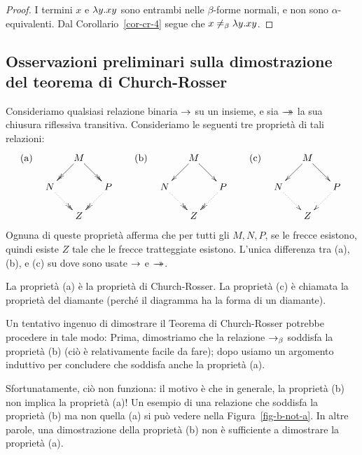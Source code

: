 \documentclass{article}
\begin{document}
\begin{proof}
  I termini $x$ e $\lambda y.xy$ sono entrambi nelle $\beta$-forme normali, e
  non sono $\alpha$-equivalenti. Dal
  Corollario~\ref{cor-cr-4} segue che $x\not=_{\beta} \lambda y.xy$. \eot
\end{proof}

\subsection{Osservazioni preliminari sulla dimostrazione del teorema di Church-Rosser}
\label{subsec-prelim-cr}

Consideriamo qualsiasi relazione binaria $\rightarrow$ su un insieme, e sia $\mathrel{\rightarrow\!\!\!\!\!\rightarrow}$ la sua
chiusura riflessiva transitiva. Consideriamo le seguenti tre
propriet\`a di tali relazioni:
\[ \mbox{(a)} \ssep \xymatrix@dr{M\ar@{->>}[r]\ar@{->>}[d] & P\ar@{.>>}[d]\\ N\ar@{.>>}[r] & Z}
\sep
\mbox{(b)} \ssep \xymatrix@dr{M\ar@{->}[r]\ar@{->}[d] & P\ar@{.>>}[d]\\ N\ar@{.>>}[r] & Z}
\sep
\mbox{(c)} \ssep \xymatrix@dr{M\ar@{->}[r]\ar@{->}[d] & P\ar@{.>}[d]\\ N\ar@{.>}[r] & Z}
\]
Ognuna di queste propriet\`a afferma che per tutti gli $M,N,P$, se le
frecce esistono, quindi esiste $Z$ tale che le frecce tratteggiate esistono.
L'unica differenza tra (a), (b), e (c) su dove
sono usate $\rightarrow$ e $\mathrel{\rightarrow\!\!\!\!\!\rightarrow}$.

La propriet\`a (a) \`e la propriet\`a di Church-Rosser. La propriet\`a (c) \`e chiamata
la propriet\`a del diamante (perch\'e il diagramma ha la forma di un diamante).

Un tentativo ingenuo di dimostrare il Teorema di Church-Rosser potrebbe procedere
in tale modo: Prima, dimostriamo che la relazione $\rightarrow_{\beta}$ soddisfa la propriet\`a (b)
(ci\`o \`e relativamente facile da fare); dopo usiamo un argomento induttivo per
concludere che soddisfa anche la propriet\`a (a).

Sfortunatamente, ci\`o non funziona: il motivo \`e che in generale,
la propriet\`a (b) non implica la propriet\`a (a)! Un esempio di una
relazione che soddisfa la propriet\`a (b) ma non quella (a) si pu\`o vedere nella
Figura~\ref{fig-b-not-a}. In altre parole, una dimostrazione della propriet\`a (b)
non \`e sufficiente a dimostrare la propriet\`a (a).
\end{document}
